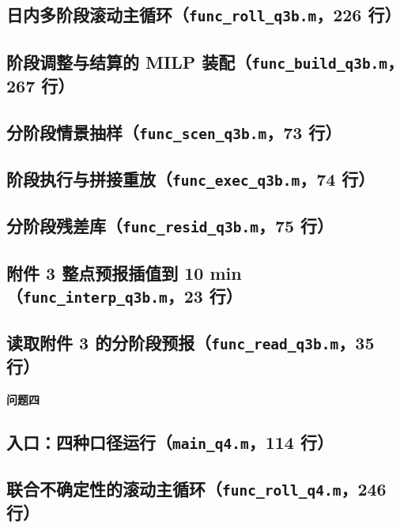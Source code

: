 \subsection{日内多阶段滚动主循环（\texttt{func_roll_q3b.m}，226 行）}

\subsection{阶段调整与结算的 MILP 装配（\texttt{func_build_q3b.m}，267 行）}

\subsection{分阶段情景抽样（\texttt{func_scen_q3b.m}，73 行）}

\subsection{阶段执行与拼接重放（\texttt{func_exec_q3b.m}，74 行）}

\subsection{分阶段残差库（\texttt{func_resid_q3b.m}，75 行）}

\subsection{附件 3 整点预报插值到 10 min（\texttt{func_interp_q3b.m}，23 行）}

\subsection{读取附件 3 的分阶段预报（\texttt{func_read_q3b.m}，35 行）}

\begingroup\noindent\textbf{问题四}\par\endgroup

\subsection{入口：四种口径运行（\texttt{main_q4.m}，114 行）}

\subsection{联合不确定性的滚动主循环（\texttt{func_roll_q4.m}，246 行）}

